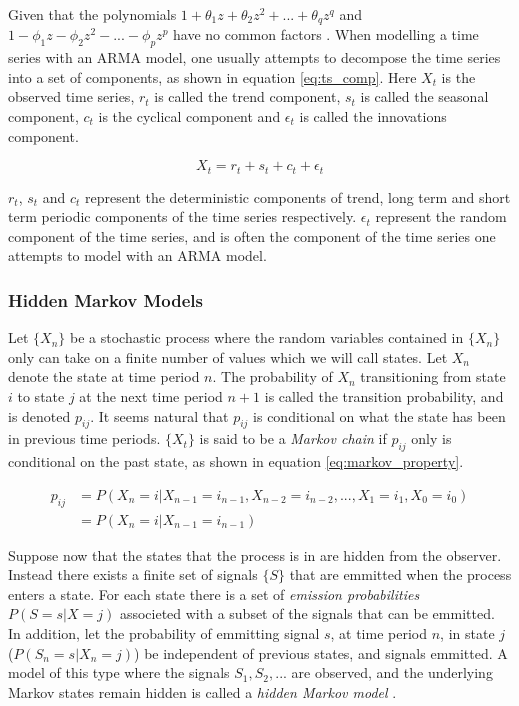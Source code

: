 Given that the polynomials $1 + \theta_1 z + \theta_2 z^2 + ... + \theta_q z^q$ and $1 - \phi_1 z - \phi_2 z^2 - ... - \phi_p z^p$ have no common factors \cite{brockwell_davis}.
When modelling a time series with an ARMA model, one usually attempts to decompose the time series into a set of components, as shown in equation \eqref{eq:ts_comp}. Here $X_t$ is the observed time series, $r_t$ is called the trend component, $s_t$ is called the seasonal component, $c_t$ is the cyclical component and $\epsilon_t$ is called the innovations component. 

\begin{equation}
    X_t = r_t + s_t + c_t + \epsilon_t
    \label{eq:ts_comp}
\end{equation}

$r_t$, $s_t$ and $c_t$ represent the deterministic components of trend, long term and short term periodic components of the time series respectively. $\epsilon_t$ represent the random component of the time series, and is often the component of the time series one attempts to model with an ARMA model. 

\subsubsection*{Hidden Markov Models} \label{s:hmm}
Let $\{X_n\}$ be a stochastic process where the random variables contained in $\{X_n\}$ only can take on a finite number of values which we will call states. 
Let $X_n$ denote the state at time period $n$. 
The probability of $X_n$ transitioning from state $i$ to state $j$ at the next time period $n+1$ is called the transition probability, and is denoted $p_{ij}$. 
It seems natural that $p_{ij}$ is conditional on what the state has been in previous time periods. 
$\{X_t\}$ is said to be a \textit{Markov chain} if $p_{ij}$ only is conditional on the past state, as shown in equation \eqref{eq:markov_property}.

\begin{equation}
    \begin{split}
        p_{ij}  &= P(X_n = i | X_{n-1} = i_{n-1}, X_{n-2} = i_{n-2},..., X_{1} = i_{1}, X_{0} = i_{0}) \\
                &= P(X_n = i | X_{n-1} = i_{n-1})      
    \end{split}
    \label{eq:markov_property}
\end{equation}

Suppose now that the states that the process is in are hidden from the observer. 
Instead there exists a finite set of signals $\{S\}$ that are emmitted when the process enters a state. 
For each state there is a set of \textit{emission probabilities} $P(S = s | X = j)$ associeted with a subset of the signals that can be emmitted.
In addition, let the probability of emmitting signal $s$, at time period $n$, in state $j$ ($P(S_n = s | X_n = j)$) be independent of previous states, and signals emmitted. 
A model of this type where the signals $S_1, S_2, ...$ are observed, and the underlying Markov states remain hidden is called a \textit{hidden Markov model} \cite{stoch_pros}. 

